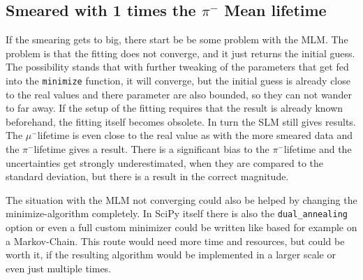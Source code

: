 \documentclass[11pt, a4paper, oneside]{book}
\newcommand{\pion}{$\pi^{-}$}
\newcommand{\muon}{$\mu^{-}$}
\begin{document}
\FloatBarrier
\subsection{Smeared with 1 times the \texorpdfstring{\pion}{pion} Mean lifetime}

If the smearing gets to big, there start be be some problem with the MLM. The problem is that the fitting does not converge, and it just returns the initial guess. The possibility stands that with further tweaking of the parameters that get fed into the \lstinline{minimize} function, it will converge, but the initial guess is already close to the real values and there parameter are also bounded, so they can not wander to far away. If the setup of the fitting requires that the result is already known beforehand, the fitting itself becomes obsolete. In turn the SLM still gives results. The \muon lifetime is even close to the real value as with the more smeared data and the \pion lifetime gives a result. There is a significant bias to the \pion lifetime and the uncertainties get strongly underestimated, when they are compared to the standard deviation, but there is a result in the correct magnitude.

The situation with the MLM not converging could also be helped by changing the minimize-algorithm completely. In SciPy itself there is also the \lstinline{dual_annealing} option or even a full custom minimizer could be written like based for example on a Markov-Chain. This route would need more time and resources, but could be worth it, if the resulting algorithm would be implemented in a larger scale or even just multiple times.
\end{document}
